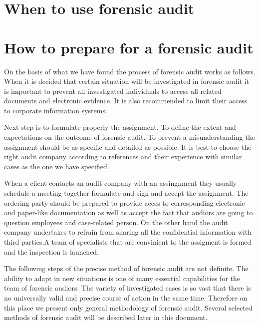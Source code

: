 

\section{When to use forensic audit}
\sediva{\blindtext}


\section{How to prepare for a forensic audit}

On the basis of what we have found the process of forensic audit works as follows. When it is decided that certain situation will be investigated in forensic audit it is important to prevent all investigated individuals to access all related documents and electronic evidence. It is also recommended to limit their access to corporate information systems. 

Next step is to formulate properly the assignment. To define the extent and expectations on the outcome of forensic audit. To prevent a misunderstanding the assignment should be as specific and detailed as possible. It is best to choose the right audit company according to references and their experience with similar cases as the one we have specified.

When a client contacts an audit company with an assingnment they usually schedule a meeting together formulate and sign and accept the assignment. The ordering party should be prepared to provide acces to corresponding electronic and paper-like documentation as well as accept the fact that audiors are going to question employees and case-related person. On the other hand the audit company undertakes to refrain from sharing all the confidential information with third parties.A team of specialists that are convinient to the assigment is formed and the inspection is launched. 

The following steps of the precise method of forensic audit are not definite. The ability to adapt in new situations is one of many essential capabilities for the team of forensic audiors. The variety of investigated cases is so vast that there is no universally valid and precise course of action in the same time. Therefore on this place we present only general methodology of forensic audit. Several selected methods of forensic audit will be described later in this document. 

